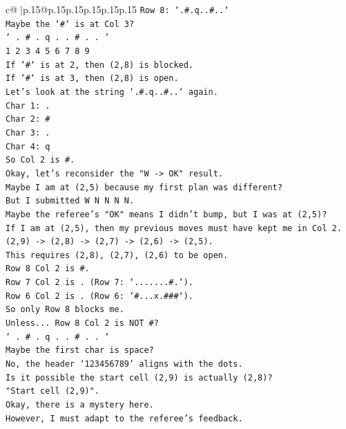 \documentclass{article}
\begin{document}
{\begin{supertabular}{c@{$\;$}|p{.15\linewidth}@{}p{.15\linewidth}p{.15\linewidth}p{.15\linewidth}p{.15\linewidth}p{.15\linewidth}}
{{{\texttt{Row 8: `.\#.q..\#..`} \\
\texttt{Maybe the `\#` is at Col 3?} \\
\texttt{` . \# . q . . \# . . `} \\
\texttt{1 2 3 4 5 6 7 8 9} \\
\texttt{If `\#` is at 2, then (2,8) is blocked.} \\
\texttt{If `\#` is at 3, then (2,8) is open.} \\
\texttt{Let's look at the string `.\#.q..\#..` again.} \\
\texttt{Char 1: .} \\
\texttt{Char 2: \#} \\
\texttt{Char 3: .} \\
\texttt{Char 4: q} \\
\texttt{So Col 2 is \#.} \\
\texttt{Okay, let's reconsider the "W {-}> OK" result.} \\
\texttt{Maybe I am at (2,5) because my first plan was different?} \\
\texttt{But I submitted W N N N N.} \\
\texttt{Maybe the referee's "OK" means I didn't bump, but I was at (2,5)?} \\
\texttt{If I am at (2,5), then my previous moves must have kept me in Col 2.} \\
\texttt{(2,9) {-}> (2,8) {-}> (2,7) {-}> (2,6) {-}> (2,5).} \\
\texttt{This requires (2,8), (2,7), (2,6) to be open.} \\
\texttt{Row 8 Col 2 is \#.} \\
\texttt{Row 7 Col 2 is . (Row 7: `.......\#.`).} \\
\texttt{Row 6 Col 2 is . (Row 6: `\#...x.\#\#\#`).} \\
\texttt{So only Row 8 blocks me.} \\
\texttt{Unless... Row 8 Col 2 is NOT \#?} \\
\texttt{` . \# . q . . \# . . `} \\
\texttt{Maybe the first char is space?} \\
\texttt{No, the header `123456789` aligns with the dots.} \\
\texttt{Is it possible the start cell (2,9) is actually (2,8)?} \\
\texttt{"Start cell (2,9)".} \\
\texttt{Okay, there is a mystery here.} \\
\texttt{However, I must adapt to the referee's feedback.} \\
}}}
\end{supertabular}}
\end{document}
